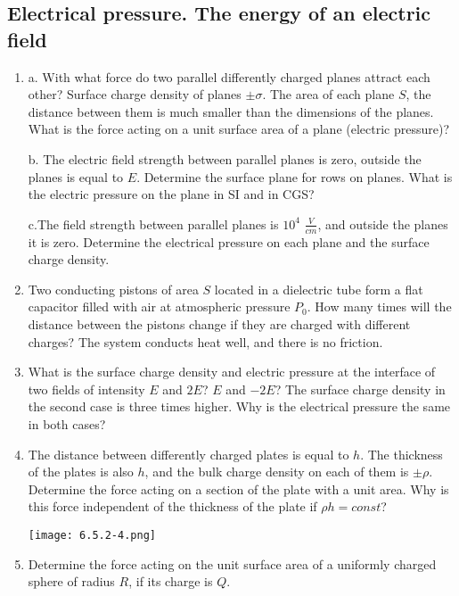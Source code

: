 \documentclass{article}
\begin{document}
\subsection{Electrical pressure. The energy of an electric field}
\begin{enumerate}[label=6.5.\arabic*]

\item a. With what force do two parallel differently charged planes attract each other? Surface charge density of planes $\pm \sigma$. The area of each plane $S$, the distance between them is much smaller than the dimensions of the planes. What is the force acting on a unit surface area of a plane (electric pressure)? 

b. The electric field strength between parallel planes is zero, outside the planes is equal to $E$. Determine the surface plane for rows on planes. What is the electric pressure on the plane in SI and in CGS? 

c.The field strength between parallel planes is $10^4$ $\frac{V}{cm}$, and outside the planes it is zero. Determine the electrical pressure on each plane and the surface charge density.

\item Two conducting pistons of area $S$ located in a dielectric tube form a flat capacitor filled with air at atmospheric pressure $P_0$. How many times will the distance between the pistons change if they are charged with different charges? The system conducts heat well, and there is no friction.

\item What is the surface charge density and electric pressure at the interface of two fields of intensity $E$ and $2E$? $E$ and $-2E$? The surface charge density in the second case is three times higher. Why is the electrical pressure the same in both cases?

\item The distance between differently charged plates is equal to $h$. The thickness of the plates is also $h$, and the bulk charge density on each of them is $\pm \rho$. Determine the force acting on a section of the plate with a unit area. Why is this force independent of the thickness of the plate if $\rho h = const$?

\begin{center}
    \texttt{[image: 6.5.2-4.png]}
\end{center}

\item Determine the force acting on the unit surface area of a uniformly charged sphere of radius $R$, if its charge is $Q$.


\end{enumerate}
\end{document}
